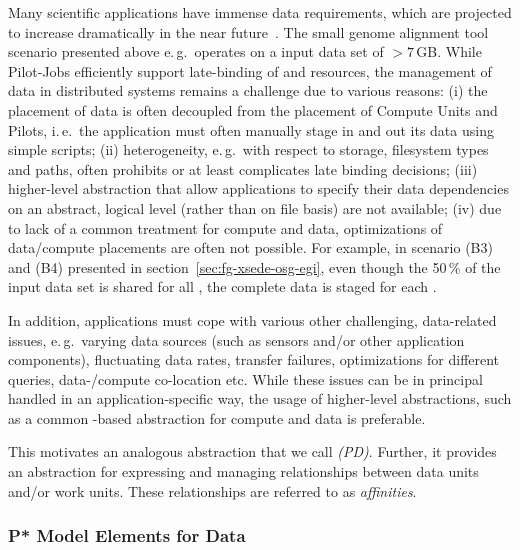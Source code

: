 \documentclass{sig-alternate}
\begin{document}
Many scientific applications have immense data requirements, which are
projected to increase dramatically in the near
future~\cite{hey2009}. The small genome alignment tool
scenario presented above e.\,g.\ operates on a input data set of
$>7$\,GB. While Pilot-Jobs efficiently support late-binding of
\computeunits and resources, the management of data in distributed
systems remains a challenge due to various reasons: (i) the placement
of data is often decoupled from the placement of Compute Units and
Pilots, i.\,e.\ the application must often manually stage in and out
its data using simple scripts;  (ii) heterogeneity, e.\,g.\ with
respect to storage, filesystem types and paths, often prohibits or at
least complicates late binding decisions; (iii) higher-level
abstraction that allow applications to specify their data dependencies
on an abstract, logical level (rather than on file basis) are not
available; (iv) due to lack of a common treatment for compute and
data, optimizations of data/compute placements are often not
possible. For example, in scenario (B3) and (B4) presented in
section~\ref{sec:fg-xsede-osg-egi}, even though the 50\,\% of the
input data set is shared for all \cus, the complete data is staged for
each \cu.

In addition, applications must cope with various other challenging,
data-related issues, e.\,g.\ varying data sources (such as sensors
and/or other application components), fluctuating data rates, transfer
failures, optimizations for different queries, data-/compute
co-location etc. While these issues can be in principal handled in an
application-specific way, the usage of higher-level abstractions, such
as a common \pilot-based abstraction for compute and data is
preferable.  


This motivates an analogous abstraction that we call \emph{\pilotdata
  (PD)}.  Further, it provides an abstraction for expressing and
managing relationships between data units and/or work units. These
relationships are referred to as \emph{affinities}.


\subsubsection*{P* Model Elements for Data}
\end{document}

